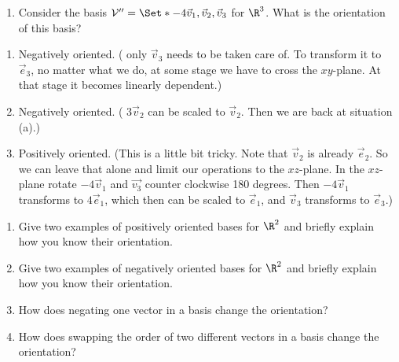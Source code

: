 \begin{exercises}
\begin{problist}
\begin{enumerate}
			\item Consider the basis $\mathcal V'' = \Set*{-4\vec v_1,
				\vec v_2, \vec v_3}$ for $\R^{3}$. What is the
				orientation of this basis?
		\end{enumerate}
		\begin{solution}
			\begin{enumerate}
				\item Negatively oriented. ( only $\vec{v}_3$ needs to be taken care of. To transform it to $\vec{e}_3$, no matter what we do,
					at some stage we have to cross the $xy$-plane. At that stage it becomes linearly dependent.)
				\item Negatively oriented. ( $3\vec{v}_2$ can be scaled to $\vec{v}_2$. Then we are back at situation (a).)
				\item Positively oriented. (This is a little bit tricky. Note that $\vec{v}_2$ is already $\vec{e}_2$. So we can leave that 
					alone and limit our operations to the $xz$-plane. In the $xz$-plane rotate $-4 \vec{v}_1$ and $\vec{v_3}$ counter 
					clockwise 180 degrees. Then $-4 \vec{v}_1$ transforms to $4 \vec{e}_1$, which then can be scaled to $\vec{e}_1$, and 
					$\vec{v}_3$ transforms to $\vec{e}_3$.)
			\end{enumerate}
		\end{solution}

		\prob
		\begin{enumerate}
			\item Give two examples of positively oriented bases for
				$\R^{2}$ and briefly explain how you know their orientation.

			\item Give two examples of negatively oriented bases for
				$\R^{2}$ and briefly explain how you know their orientation.

			\item How does negating one vector in a basis change the
				orientation?

			\item How does swapping the order of two different vectors
				in a basis change the orientation?
		\end{enumerate}
	\end{problist}
\end{exercises}
